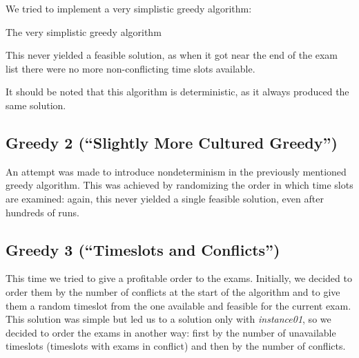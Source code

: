 \documentclass[11pt, a4paper, leqno]{article}
\begin{document}
	We tried to implement a very simplistic greedy algorithm:
	
	\begin{algorithm}[H]
		\caption{The very simplistic greedy algorithm}
	\end{algorithm}

	This never yielded a feasible solution, as when it got near the end of the exam list there were no more non-conflicting time slots available.
	
	It should be noted that this algorithm is deterministic, as it always produced the same solution.
	
	\subsection{Greedy 2 (``Slightly More Cultured Greedy'')}
	
	An attempt was made to introduce nondeterminism in the previously mentioned greedy algorithm. This was achieved by randomizing the order in which time slots are examined: again, this never yielded a single feasible solution, even after hundreds of runs.
	
	\subsection{Greedy 3 (``Timeslots and Conflicts'')}
	
	This time we tried to give a profitable order to the exams. Initially, we decided to order them by the number of conflicts at the start of the algorithm and to give them a random timeslot from the one available and feasible for the current exam. This solution was simple but led us to a solution only with \textit{instance01}, so we decided to order the exams in another way: first by the number of unavailable timeslots (timeslots with exams in conflict) and then by the number of conflicts. 
	
\end{document}
